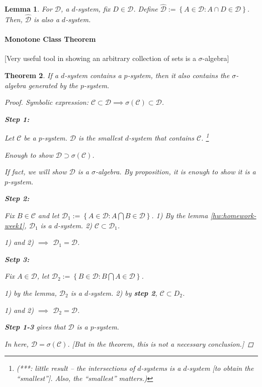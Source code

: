 \documentclass[11pt]{article}
\newtheorem{theorem}{Theorem}[subsection]
\newtheorem{lemma}[theorem]{Lemma}
\begin{document}
\begin{lemma}
  For $\mathcal D$, a $d$-system, fix $D\in \mathcal D$. Define $\hat { \mathcal D}
  := \left\{ A \in \mathcal D : A\cap D \in \mathcal D \right\}$. Then, $\hat
  {\mathcal D} $ is also a $d$-system.
  \label{lemma:d-system}
  \label{hw:homework-week1}
\end{lemma}

\paragraph{Monotone Class Theorem}

[Very useful tool in showing an arbitrary collection of sets is a $\sigma$-algebra]

\begin{theorem}
  If a $d$-system contains a $p$-system, then it also contains the
  $\sigma$-algebra generated by the $p$-system.
  \label{thm:monotone-class-theorem}
  \begin{proof}
    Symbolic expression: $\mathcal C \subset \mathcal D \implies \sigma
    (\mathcal C) \subset \mathcal D$.

    \textbf{Step 1: }


    Let $\mathcal C$ be a $p$-system. $\mathcal D$ is the smallest $d$-system
    that contains $\mathcal C$. 
    \footnote{(***: little result -- the intersections of
      $d$-systems is a $d$-system [to obtain the ``smallest'']. Also, the
    ``smallest'' matters.)}

    Enough to show $\mathcal D \supset \sigma (\mathcal C)$. 

    If fact, we will show $\mathcal D$ is a $\sigma$-algebra. By proposition, it
    is enough to show it is a $p$-system. 

    \textbf{Step 2: }

    Fix $B \in \mathcal C$ and let $\mathcal D_1 := \left\{ A \in \mathcal D : A
    \bigcap B \in \mathcal D\right\}$. 1) By the lemma \ref{hw:homework-week1},
    $\mathcal D_1$ is a $d$-system. 2) $\mathcal C \subset \mathcal D_1$. 

    1) and 2) $\implies $ $\mathcal D_1 = \mathcal D$.


    \textbf{Setp 3: }

    Fix $A\in \mathcal D$, let $\mathcal D_2 := \left\{ B \in \mathcal D :
    B\bigcap A \in \mathcal D \right\}$. 

    1) by the lemma, $\mathcal D_2$ is a $d$-system. 2) by \textbf{step 2},
    $\mathcal C \subset D_2$. 

    1) and 2) $\implies$ $\mathcal D_2 = \mathcal D$. 



    \textbf{Step 1-3} gives that $\mathcal D$ is a $p$-system.




    In here, $\mathcal D = \sigma ( \mathcal C)$. [But in the theorem, this is
    not a necessary conclusion.]
  \end{proof}
\end{theorem}
\end{document}
